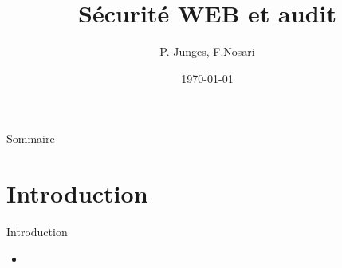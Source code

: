 \documentclass{beamer}
\title{Sécurité WEB et audit}
\author{P. Junges, F.Nosari}
\institute{Faculté des Sciences et Technologies}
\date{\today}
\begin{document}
	
	\begin{frame}
	\titlepage
\end{frame}

\begin{frame}{Sommaire}
\tableofcontents
\end{frame}

\section{Introduction}

\begin{frame}{Introduction}
\begin{itemize}
\item %

\end{itemize}
\end{frame}
\end{document}
